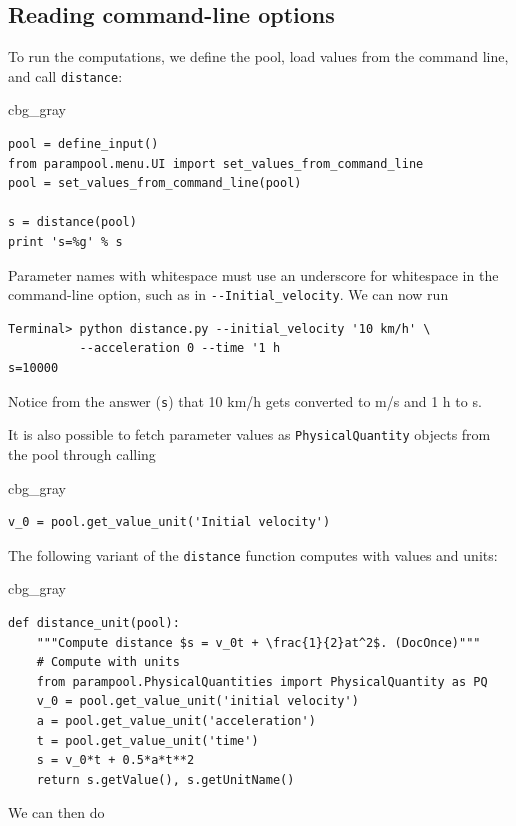 \documentclass[graybox,envcountchap,sectrefs,final]{svmonodo}
\newenvironment{_cod_tight}[1]{
   \def\FrameCommand{\colorbox{#1}}
   \FrameRule0.6pt\MakeFramed {\FrameRestore}\vskip3mm}
   {\vskip0mm\endMakeFramed}
\newenvironment{cod}[1]{
\bgroup\rmfamily
\fboxsep=0mm\relax
\begin{_cod_tight}{#1}
\list{}{\parsep=-2mm\parskip=0mm\topsep=0pt\leftmargin=2mm
\rightmargin=2\leftmargin\leftmargin=4pt\relax}
\item\relax}
{\endlist\end{_cod_tight}\egroup}
\begin{document}
\subsection{Reading command-line options}

To run the computations, we define the pool, load values from the
command line, and call \texttt{distance}:

\begin{cod}{cbg_gray}\begin{Verbatim}[numbers=none,fontsize=\fontsize{9pt}{9pt},baselinestretch=0.95,xleftmargin=2mm]
pool = define_input()
from parampool.menu.UI import set_values_from_command_line
pool = set_values_from_command_line(pool)

s = distance(pool)
print 's=%g' % s
\end{Verbatim}
\end{cod}
\noindent

Parameter names with whitespace must use an underscore for whitespace
in the command-line option, such as in \Verb!--Initial_velocity!.
We can now run

\begin{Verbatim}[frame=lines,label=\fbox{{\tiny Terminal}},framesep=2.5mm,framerule=0.7pt,fontsize=\fontsize{9pt}{9pt}]
Terminal> python distance.py --initial_velocity '10 km/h' \ 
          --acceleration 0 --time '1 h
s=10000
\end{Verbatim}
Notice from the answer (\texttt{s}) that 10 km/h gets converted to m/s and 1 h to s.

It is also possible to fetch parameter values as \texttt{PhysicalQuantity}
objects from the pool through calling

\begin{cod}{cbg_gray}\begin{Verbatim}[numbers=none,fontsize=\fontsize{9pt}{9pt},baselinestretch=0.95,xleftmargin=2mm]
v_0 = pool.get_value_unit('Initial velocity')
\end{Verbatim}
\end{cod}
\noindent
The following variant of the \texttt{distance} function computes with
values and units:

\begin{cod}{cbg_gray}\begin{Verbatim}[numbers=none,fontsize=\fontsize{9pt}{9pt},baselinestretch=0.95,xleftmargin=2mm]
def distance_unit(pool):
    """Compute distance $s = v_0t + \frac{1}{2}at^2$. (DocOnce)"""
    # Compute with units
    from parampool.PhysicalQuantities import PhysicalQuantity as PQ
    v_0 = pool.get_value_unit('initial velocity')
    a = pool.get_value_unit('acceleration')
    t = pool.get_value_unit('time')
    s = v_0*t + 0.5*a*t**2
    return s.getValue(), s.getUnitName()
\end{Verbatim}
\end{cod}
\noindent
We can then do
\end{document}
